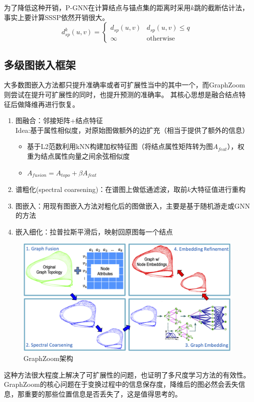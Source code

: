 \documentclass[reportComp]{thesis}
\begin{document}
为了降低这种开销，P-GNN在计算结点与锚点集的距离时采用$k$跳的截断估计法，事实上要计算SSSP依然开销很大。
\[d_{sp}^k(u,v)=\begin{cases}
d_{sp}(u,v) & d_{sp}(u,v)\leq q\\
\infty & \text{otherwise}
\end{cases}\]

\subsection{多级图嵌入框架}
大多数图嵌入方法都只提升准确率或者可扩展性当中的其中一个，而GraphZoom则尝试在提升可扩展性的同时，也提升预测的准确率。
其核心思想是融合结点特征后做降维再进行恢复。
\begin{enumerate}
	\item 图融合：邻接矩阵+结点特征\\
	Idea:基于属性相似度，对原始图做额外的边扩充（相当于提供了额外的信息）
	\begin{itemize}
		\item 基于L2范数利用kNN构建加权特征图（将结点属性矩阵转为图$A_{feat}$），权重为结点属性向量之间余弦相似度
		\item $A_{fusion}=A_{topo}+\beta A_{feat}$
	\end{itemize}
	\item 谱粗化(spectral coarsening)：在谱图上做低通滤波，取前$k$大特征值进行重构
	\item 图嵌入：用现有图嵌入方法对粗化后的图做嵌入，主要是基于随机游走或GNN的方法
	\item 嵌入细化：拉普拉斯平滑后，映射回原图每一个结点
\end{enumerate}
\begin{figure}[H]
\centering
\includegraphics[width=0.8\linewidth]{fig/GraphZoom.png}
\caption{GraphZoom架构}
\end{figure}

这种方法很大程度上解决了可扩展性的问题，也证明了多尺度学习方法的有效性。
GraphZoom的核心问题在于变换过程中的信息保存度，降维后的图必然会丢失信息，那重要的那些位置信息是否丢失了，这是值得思考的。
\end{document}
